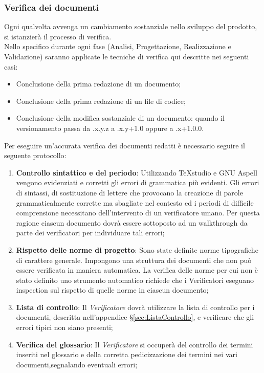 {	\subsubsection{Verifica dei documenti}
	\label{sec:VerificaDocumenti}
	Ogni qualvolta avvenga un cambiamento sostanziale nello sviluppo del prodotto, si istanzierà il processo di verifica. \\
		Nello specifico durante ogni fase (Analisi, Progettazione, Realizzazione e Validazione) saranno applicate le tecniche di verifica qui descritte nei seguenti casi:
		\begin{itemize}
			\item Conclusione della prima redazione di un documento;
			\item Conclusione della prima redazione di un file\ped{g} di codice;
			\item Conclusione della modifica sostanziale di un documento: quando il versionamento passa da .x.y.z a .x.y+1.0 oppure a .x+1.0.0.
		\end{itemize}
	Per eseguire un'accurata verifica dei documenti redatti è necessario seguire il seguente protocollo:
	\begin{enumerate}
	\item \textbf{Controllo sintattico e del periodo}: Utilizzando TeXstudio e GNU Aspell vengono evidenziati e corretti gli errori di grammatica più evidenti. Gli errori di sintassi, di sostituzione di lettere che provocano la creazione di parole grammaticalmente corrette ma sbagliate nel contesto ed i periodi di difficile comprensione necessitano dell’intervento di un verificatore umano. Per questa ragione ciascun documento dovrà essere sottoposto ad un walkthrough da parte dei verificatori per individuare tali errori;
	\item \textbf{Rispetto delle norme di progetto}: Sono state definite norme tipografiche di carattere generale. Impongono una struttura dei documenti che non può essere verificata in maniera automatica. La verifica delle norme
	per cui non è stato definito uno strumento automatico richiede che i Verificatori eseguano inspection sul rispetto di quelle norme in ciascun documento;
	\item \textbf{Lista di controllo}: Il \emph{Verificatore} dovrà utilizzare la lista di controllo per i
	documenti, descritta nell’appendice \S\ref{sec:ListaControllo}, e verificare che gli errori tipici non siano	presenti;
	\item \textbf{Verifica del glossario}: Il \emph{Verificatore} si occuperà del controllo dei termini inseriti nel glossario e della corretta pedicizzazione dei termini nei vari documenti,segnalando eventuali errori;

\end{enumerate}}
